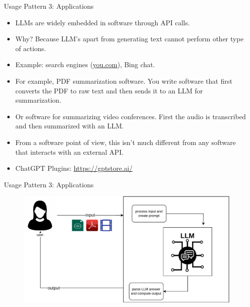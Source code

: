 \documentclass[handout]{beamer}
\begin{document}
\begin{frame}{Usage Pattern 3: Applications}
\begin{scriptsize}
\begin{itemize}
\item LLMs are widely embedded in software through API calls.
\item Why? Because LLM's apart from generating text cannot perform other type of actions.
\item Example: search engines (\url{you.com}), Bing chat.
\item For example, PDF summarization software. You write software that first converts the PDF to raw text and then sends it to an LLM for summarization.
\item Or software for summarizing video conferences. First the audio is transcribed and then summarized with an LLM.
\item From a software point of view, this isn't much different from any software that interacts with an external API.
\item ChatGPT Plugins: \url{https://gptstore.ai/}
\end{itemize}
\end{scriptsize}
\end{frame}


\begin{frame}{Usage Pattern 3: Applications}

      \begin{figure}[h]
	\includegraphics[scale = 0.55]{pics/llmsapp.pdf}
\end{figure}

\end{frame}
\end{document}
